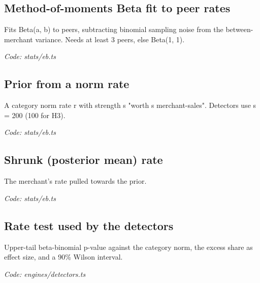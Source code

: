 \documentclass[11pt,a4paper]{article}
\newcommand{\where}[1]{\par{\small\itshape\color{mute}Code: #1}\par}
\begin{document}
\subsection*{Method-of-moments Beta fit to peer rates}
\par\smallskip\noindent{}\par\smallskip
\par\smallskip\noindent{}\par\smallskip
\par\smallskip\noindent{}\par\smallskip
Fits Beta(a, b) to peers, subtracting binomial sampling noise from the between-merchant variance. Needs at least 3 peers, else Beta(1, 1).
\where{stats/eb.ts}

\subsection*{Prior from a norm rate}
\par\smallskip\noindent{}\par\smallskip
A category norm rate r with strength s "worth s merchant-sales". Detectors use s = 200 (100 for H3).
\where{stats/eb.ts}

\subsection*{Shrunk (posterior mean) rate}
\par\smallskip\noindent{}\par\smallskip
The merchant's rate pulled towards the prior.
\where{stats/eb.ts}

\subsection*{Rate test used by the detectors}
\par\smallskip\noindent{}\par\smallskip
Upper-tail beta-binomial p-value against the category norm, the excess share as effect size, and a 90\% Wilson interval.
\where{engines/detectors.ts}
\end{document}
